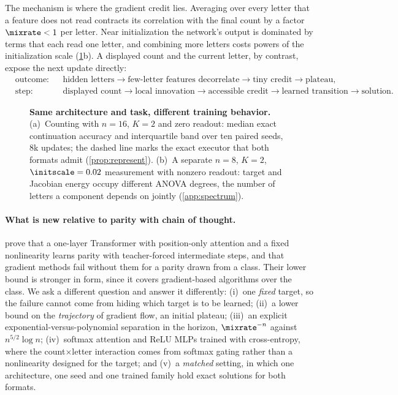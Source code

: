 The mechanism is where the gradient credit lies. Averaging over every letter that a feature does not read contracts its correlation with
the final count by a factor $\mixrate<1$ per letter. Near initialization the network's output is dominated by terms that each read one
letter, and combining more letters costs powers of the initialization scale (\cref{fig:overview}b). A displayed count and the current
letter, by contrast, expose the next update directly:
{\small
\[
\begin{aligned}
 &\text{outcome:}&&\text{hidden letters}\to\text{few-letter features decorrelate}\to\text{tiny credit}\to\text{plateau},\\
 &\text{step:}&&\text{displayed count}\to\text{local innovation}\to\text{accessible credit}\to\text{learned transition}\to\text{solution}.
\end{aligned}
\]
}

\begin{figure}[t]
\centering

\caption{\textbf{Same architecture and task, different training behavior.}
(a)~Counting with $n=16$, $K=2$ and zero readout: median exact continuation accuracy and interquartile band over ten paired seeds, $8$k
updates; the dashed line marks the exact executor that both formats admit (\cref{prop:represent}).
(b)~A separate $n=8$, $K=2$, $\initscale=0.02$ measurement with nonzero readout: target and Jacobian energy occupy different ANOVA degrees, the number of letters a component depends on jointly (\cref{app:spectrum}).}
\label{fig:overview}
\end{figure}

\paragraph{What is new relative to parity with chain of thought.} \citet{kim2024parity} prove that a one-layer Transformer with
position-only attention and a fixed nonlinearity learns parity with teacher-forced intermediate steps, and that gradient methods fail
without them for a parity drawn from a class. Their lower bound is stronger in form, since it covers gradient-based algorithms over the
class. We ask a different question and answer it differently: (i)~one \emph{fixed} target, so the failure cannot come from hiding which
target is to be learned; (ii)~a lower bound on the \emph{trajectory} of gradient flow, an initial plateau; (iii)~an explicit
exponential-versus-polynomial separation in the horizon, $\mixrate^{-n}$ against $n^{5/2}\log n$; (iv)~softmax attention and ReLU MLPs
trained with cross-entropy, where the count$\times$letter interaction comes from softmax gating rather than a nonlinearity designed
for the target; and (v)~a \emph{matched} setting, in which one architecture, one seed and one trained family hold exact
solutions for both formats.

